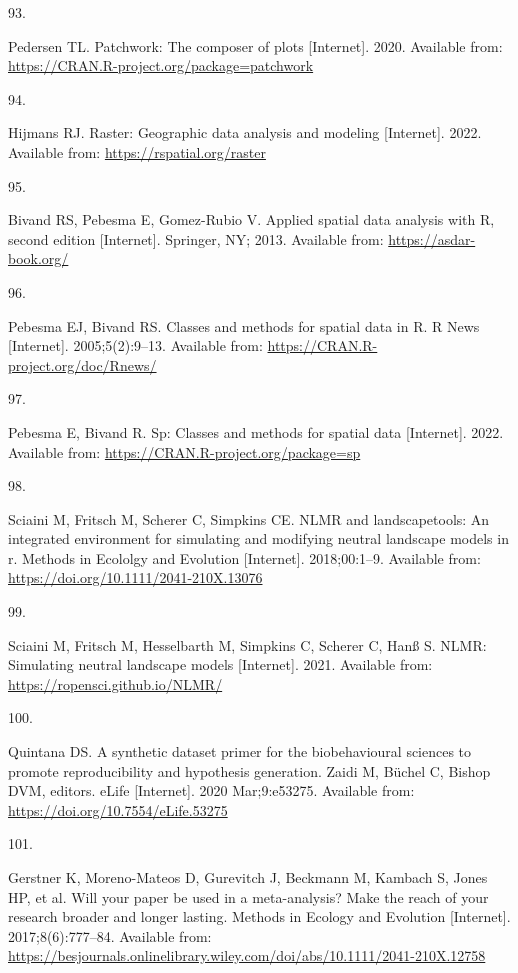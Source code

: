 \documentclass[10pt,a4paper]{article}
\newlength{\cslhangindent}
\newlength{\csllabelwidth}
\newlength{\cslentryspacingunit} %
\newenvironment{CSLReferences}[2] %
 {%
  \setlength{\parindent}{0pt}
  \ifodd #1
  \let\oldpar\par
  \def\par{\hangindent=\cslhangindent\oldpar}
  \fi
  \setlength{\parskip}{#2\cslentryspacingunit}
 }%
 {}
\newcommand{\CSLLeftMargin}[1]{\parbox[t]{\csllabelwidth}{#1}}
\newcommand{\CSLRightInline}[1]{\parbox[t]{\linewidth - \csllabelwidth}{#1}\break}
\begin{document}
\begin{CSLReferences}{0}{0}
\leavevmode{}%
\CSLLeftMargin{93. }
\CSLRightInline{Pedersen TL. Patchwork: The composer of plots {[}Internet{]}. 2020. Available from: \url{https://CRAN.R-project.org/package=patchwork}}

\leavevmode{}%
\CSLLeftMargin{94. }
\CSLRightInline{Hijmans RJ. Raster: Geographic data analysis and modeling {[}Internet{]}. 2022. Available from: \url{https://rspatial.org/raster}}

\leavevmode{}%
\CSLLeftMargin{95. }
\CSLRightInline{Bivand RS, Pebesma E, Gomez-Rubio V. Applied spatial data analysis with {R}, second edition {[}Internet{]}. Springer, NY; 2013. Available from: \url{https://asdar-book.org/}}

\leavevmode{}%
\CSLLeftMargin{96. }
\CSLRightInline{Pebesma EJ, Bivand RS. Classes and methods for spatial data in {R}. R News {[}Internet{]}. 2005;5(2):9--13. Available from: \url{https://CRAN.R-project.org/doc/Rnews/}}

\leavevmode{}%
\CSLLeftMargin{97. }
\CSLRightInline{Pebesma E, Bivand R. Sp: Classes and methods for spatial data {[}Internet{]}. 2022. Available from: \url{https://CRAN.R-project.org/package=sp}}

\leavevmode{}%
\CSLLeftMargin{98. }
\CSLRightInline{Sciaini M, Fritsch M, Scherer C, Simpkins CE. NLMR and landscapetools: An integrated environment for simulating and modifying neutral landscape models in r. Methods in Ecololgy and Evolution {[}Internet{]}. 2018;00:1--9. Available from: \url{https://doi.org/10.1111/2041-210X.13076}}

\leavevmode{}%
\CSLLeftMargin{99. }
\CSLRightInline{Sciaini M, Fritsch M, Hesselbarth M, Simpkins C, Scherer C, Hanß S. NLMR: Simulating neutral landscape models {[}Internet{]}. 2021. Available from: \url{https://ropensci.github.io/NLMR/}}

\leavevmode{}%
\CSLLeftMargin{100. }
\CSLRightInline{Quintana DS. A synthetic dataset primer for the biobehavioural sciences to promote reproducibility and hypothesis generation. Zaidi M, Büchel C, Bishop DVM, editors. eLife {[}Internet{]}. 2020 Mar;9:e53275. Available from: \url{https://doi.org/10.7554/eLife.53275}}

\leavevmode{}%
\CSLLeftMargin{101. }
\CSLRightInline{Gerstner K, Moreno-Mateos D, Gurevitch J, Beckmann M, Kambach S, Jones HP, et al. Will your paper be used in a meta-analysis? Make the reach of your research broader and longer lasting. Methods in Ecology and Evolution {[}Internet{]}. 2017;8(6):777--84. Available from: \url{https://besjournals.onlinelibrary.wiley.com/doi/abs/10.1111/2041-210X.12758}}

\end{CSLReferences}
\end{document}
